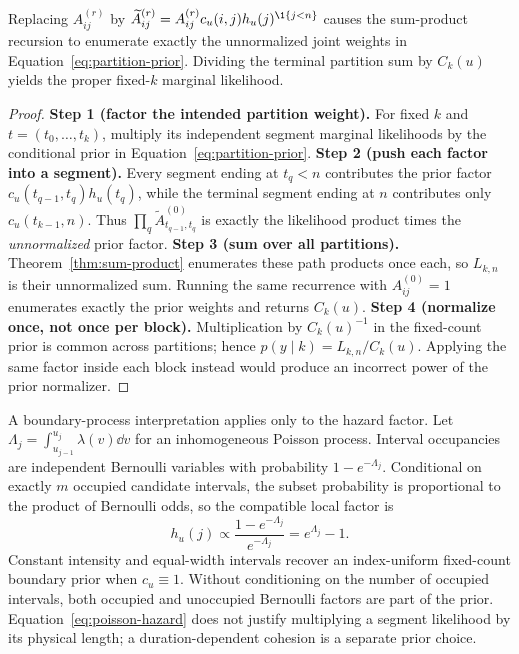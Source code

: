 \begin{theorem}
\label{thm:local-prior-paper}
Replacing $A^{(r)}_{ij}$ by
$\widetilde A^{(r)}_{ij}=A^{(r)}_{ij}c_u(i,j)h_u(j)^{\1\{j<n\}}$
causes the sum-product recursion to enumerate exactly the unnormalized joint weights in Equation~\eqref{eq:partition-prior}. Dividing the terminal partition sum by $C_k(u)$ yields the proper fixed-$k$ marginal likelihood.
\end{theorem}
\begin{proof}
\textbf{Step 1 (factor the intended partition weight).}
For fixed $k$ and $t=(t_0,\ldots,t_k)$, multiply its independent segment marginal likelihoods by the conditional prior in Equation~\eqref{eq:partition-prior}.
\textbf{Step 2 (push each factor into a segment).}
Every segment ending at $t_q<n$ contributes the prior factor $c_u(t_{q-1},t_q)h_u(t_q)$, while the terminal segment ending at $n$ contributes only $c_u(t_{k-1},n)$. Thus $\prod_q\widetilde A^{(0)}_{t_{q-1},t_q}$ is exactly the likelihood product times the \emph{unnormalized} prior factor.
\textbf{Step 3 (sum over all partitions).}
Theorem~\ref{thm:sum-product} enumerates these path products once each, so $L_{k,n}$ is their unnormalized sum. Running the same recurrence with $A^{(0)}_{ij}=1$ enumerates exactly the prior weights and returns $C_k(u)$.
\textbf{Step 4 (normalize once, not once per block).}
Multiplication by $C_k(u)^{-1}$ in the fixed-count prior is common across partitions; hence $p(y\mid k)=L_{k,n}/C_k(u)$. Applying the same factor inside each block instead would produce an incorrect power of the prior normalizer.
\end{proof}

A boundary-process interpretation applies only to the hazard factor. Let
$\Lambda_j=\int_{u_{j-1}}^{u_j}\lambda(v)\dd v$ for an inhomogeneous Poisson process. Interval
occupancies are independent Bernoulli variables with probability $1-e^{-\Lambda_j}$. Conditional
on exactly $m$ occupied candidate intervals, the subset probability is proportional to the product
of Bernoulli odds, so the compatible local factor is
\begin{equation}
 h_u(j)\propto \frac{1-e^{-\Lambda_j}}{e^{-\Lambda_j}}=e^{\Lambda_j}-1.
\label{eq:poisson-hazard}
\end{equation}
Constant intensity and equal-width intervals recover an index-uniform fixed-count boundary prior when $c_u\equiv1$. Without conditioning on the number of occupied intervals, both occupied and unoccupied Bernoulli factors are part of the prior. Equation~\eqref{eq:poisson-hazard} does not justify multiplying a segment likelihood by its physical length; a duration-dependent cohesion is a separate prior choice.

